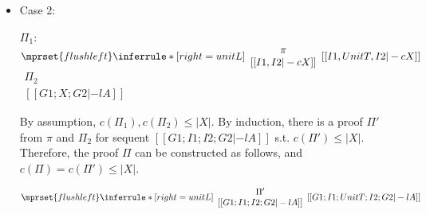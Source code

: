 \begin{itemize}
\item Case 2:
      \begin{center}
        \scriptsize
        $\Pi_1$:
        \begin{math}
          $$\mprset{flushleft}
          \inferrule* [right={\tiny unitL}] {
            {
              \begin{array}{c}
                \pi \\
                {[[I1, I2 |-c X]]}
              \end{array}
            }
          }{[[I1, UnitT, I2 |-c X]]}
        \end{math}
        \qquad\qquad
        \begin{math}
          \begin{array}{c}
            \Pi_2 \\
            {[[G1; X; G2 |-l A]]}
          \end{array}
        \end{math}
      \end{center}
      By assumption, $c(\Pi_1),c(\Pi_2)\leq |X|$. By induction, there is a
      proof $\Pi'$ from $\pi$ and $\Pi_2$ for sequent
      $[[G1; I1; I2; G2 |-l A]]$
      s.t. $c(\Pi')\leq |X|$. Therefore, the proof $\Pi$ can be constructed
      as follows, and $c(\Pi)=c(\Pi')\leq |X|$.
      \begin{center}
        \scriptsize
        \begin{math}
          $$\mprset{flushleft}
          \inferrule* [right={\tiny unitL}] {
            {
              \begin{array}{c}
                \Pi' \\
                {[[G1; I1; I2; G2 |-l A]]}
              \end{array}
            }
          }{[[G1; I1; UnitT; I2; G2 |-l A]]}
        \end{math}
      \end{center}


\end{itemize}
